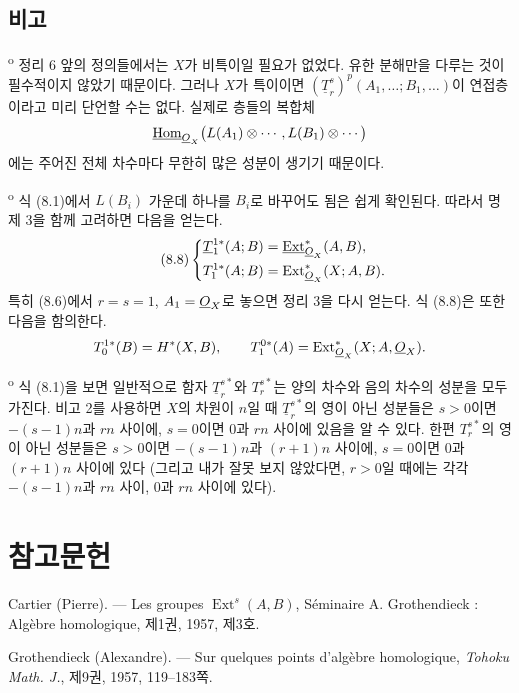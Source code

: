 \subsection*{비고}

\textsuperscript{o} 정리 6 앞의 정의들에서는 $X$가
비특이일 필요가 없었다. 유한 분해만을 다루는 것이 필수적이지 않았기
때문이다. 그러나 $X$가 특이이면
$(\underline{T}_{r}^{s})^{p}(A_1,\ldots;B_1,\ldots)$이 연접층이라고
미리 단언할 수는 없다. 실제로 층들의 복합체
\[
  \underline{\operatorname{Hom}}_{\underline{O}_X}\bigl(L(A_1)\otimes\cdots,L(B_1)\otimes\cdots\bigr)
\]
에는 주어진 전체 차수마다 무한히 많은 성분이 생기기 때문이다.

\medskip
{}\textsuperscript{o} 식 (8.1)에서 $L(B_i)$ 가운데 하나를
$B_i$로 바꾸어도 됨은 쉽게 확인된다. 따라서 명제 3을 함께 고려하면
다음을 얻는다.
\begin{equation}\tag{8.8}
\left\{
\begin{aligned}
  \underline{T}_{1}^{1*}(A;B)&=\underline{\operatorname{Ext}}_{\underline{O}_X}^{*}(A,B),\\
  T_{1}^{1*}(A;B)&=\operatorname{Ext}_{\underline{O}_X}^{*}(X;A,B).
\end{aligned}
\right.
\end{equation}
특히 (8.6)에서 $r=s=1$, $A_1=\underline{O}_X$로 놓으면 정리 3을 다시 얻는다.
식 (8.8)은 또한 다음을 함의한다.
\[
  T_{0}^{1*}(B)=H^{*}(X,B),
  \qquad
  T_{1}^{0*}(A)=\operatorname{Ext}_{\underline{O}_X}^{*}(X;A,\underline{O}_X).
\]

\medskip
{}\textsuperscript{o} 식 (8.1)을 보면 일반적으로 함자
$\underline{T}_{r}^{s*}$와 $T_{r}^{s*}$는 양의 차수와 음의 차수의
성분을 모두 가진다. 비고 2를 사용하면 $X$의 차원이 $n$일 때
$\underline{T}_{r}^{s*}$의 영이 아닌 성분들은 $s>0$이면
$-(s-1)n$과 $rn$ 사이에, $s=0$이면 $0$과 $rn$ 사이에 있음을 알 수
있다. 한편 $T_{r}^{s*}$의 영이 아닌 성분들은 $s>0$이면
$-(s-1)n$과 $(r+1)n$ 사이에, $s=0$이면 $0$과 $(r+1)n$ 사이에 있다
(그리고 내가 잘못 보지 않았다면, $r>0$일 때에는 각각
$-(s-1)n$과 $rn$ 사이, $0$과 $rn$ 사이에 있다).

\section*{참고문헌}

\noindent[1] Cartier (Pierre). --- Les groupes
$\operatorname{Ext}^{s}(A,B)$, Séminaire A. Grothendieck : Algèbre homologique,
제1권, 1957, 제3호.

\noindent[2] Grothendieck (Alexandre). --- Sur quelques points d'algèbre
homologique, \emph{Tohoku Math. J.}, 제9권, 1957, 119--183쪽.

